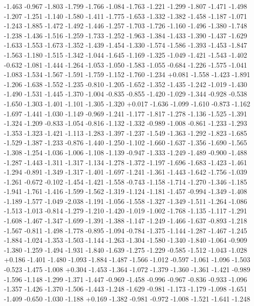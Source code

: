 \documentclass[9pt]{article}
\theoremstyle{plain}
\theoremstyle{definition}
\theoremstyle{remark}
\numberwithin{equation}{section}
\begin{document}
-1.463
-0.967
-1.803
-1.799
-1.766
-1.084
-1.763
-1.221
-1.299
-1.807
-1.471
-1.498
-1.207
-1.251
-1.140
-1.580
-1.411
-1.775
-1.653
-1.332
-1.382
-1.458
-1.187
-1.071
-1.243
-1.885
-1.472
-1.492
-1.446
-1.257
-1.703
-1.726
-1.160
-1.496
-1.380
-1.748
-1.238
-1.436
-1.516
-1.259
-1.733
-1.252
-1.963
-1.384
-1.433
-1.390
-1.437
-1.629
-1.633
-1.553
-1.673
-1.352
-1.439
-1.454
-1.330
-1.574
-1.586
-1.393
-1.453
-1.847
-1.563
-1.180
-1.515
-1.342
-1.044
-1.645
-1.169
-1.325
-1.049
-1.421
-1.543
-1.402
-0.632
-1.081
-1.444
-1.264
-1.053
-1.050
-1.583
-1.055
-0.684
-1.226
-1.575
-1.041
-1.083
-1.534
-1.567
-1.591
-1.759
-1.152
-1.760
-1.234
+0.081
-1.558
-1.423
-1.891
-1.206
-1.638
-1.552
-1.235
-0.810
-1.205
-1.652
-1.352
-1.435
-1.242
-1.019
-1.430
-1.490
-1.531
-1.445
-1.370
-1.004
-0.835
-0.855
-1.420
-1.029
-1.344
-0.928
-0.538
-1.650
-1.303
-1.401
-1.101
-1.305
-1.320
+0.017
-1.636
-1.099
-1.610
-0.873
-1.162
-1.697
-1.441
-1.030
-1.149
-0.969
-1.241
-1.177
-1.817
-1.278
-1.136
-1.525
-1.391
-1.324
-1.209
-0.833
-1.054
-0.816
-1.132
-1.332
-0.989
-1.008
-0.861
-1.233
-1.293
-1.353
-1.323
-1.421
-1.113
-1.283
-1.397
-1.237
-1.549
-1.363
-1.292
-1.823
-1.685
-1.529
-1.387
-1.233
-0.876
-1.440
-1.250
-1.102
-1.660
-1.637
-1.356
-1.690
-1.565
-1.308
-1.254
-1.036
-1.006
-1.108
-1.139
-0.947
-1.333
-1.249
-1.489
-0.900
-1.488
-1.287
-1.443
-1.311
-1.317
-1.134
-1.278
-1.372
-1.197
-1.696
-1.683
-1.423
-1.461
-1.294
-0.891
-1.349
-1.317
-1.401
-1.697
-1.241
-1.361
-1.443
-1.642
-1.756
-1.039
-1.261
-0.672
-0.102
-1.454
-1.421
-1.558
-0.743
-1.158
-1.714
-1.270
-1.346
-1.185
-1.941
-1.761
-1.416
-1.599
-1.562
-1.319
-1.124
-1.181
-1.457
-0.994
-1.349
-1.408
-1.189
-1.577
-1.049
-2.038
-1.191
-1.056
-1.558
-1.327
-1.349
-1.511
-1.264
-1.086
-1.513
-1.013
-0.814
-1.279
-1.210
-1.420
-1.019
-1.002
-1.768
-1.135
-1.117
-1.291
-1.608
-1.467
-1.347
-1.699
-1.391
-1.388
-1.147
-1.249
-1.466
-1.637
-0.893
-1.218
-1.567
-0.811
-1.498
-1.778
-0.895
-1.094
-0.784
-1.375
-1.144
-1.287
-1.467
-1.245
-1.884
-1.024
-1.353
-1.503
-1.144
-1.263
-1.304
-1.580
-1.340
-1.840
-1.064
-0.909
-1.380
-1.259
-1.494
-1.931
-1.840
-1.639
-1.275
-1.229
-0.585
-1.512
-1.043
-1.028
+0.186
-1.401
-1.480
-1.093
-1.884
-1.487
-1.566
-1.012
-0.597
-1.061
-1.096
-1.503
-0.523
-1.475
-1.008
+0.304
-1.453
-1.364
-1.072
-1.379
-1.360
-1.361
-1.421
-0.989
-1.596
-1.148
-1.299
-1.371
-1.447
-0.969
-1.458
-0.996
-0.967
-0.836
-0.933
-1.096
-1.357
-1.426
-1.370
-1.506
-1.443
-1.248
-1.629
-0.981
-1.173
-1.179
-1.098
-1.651
-1.409
-0.650
-1.030
-1.188
+0.169
-1.382
-0.981
-0.972
-1.008
-1.521
-1.641
-1.248
\end{document}
